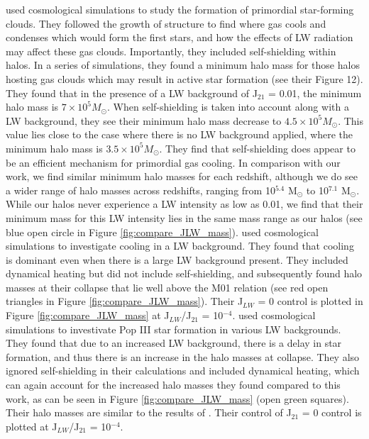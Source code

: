 \documentclass[a4paper,fleqn,usenatbib]{mnras}
\begin{document}
\citet{Yoshida03} used cosmological simulations to study the formation of primordial star-forming clouds. They followed the growth of structure to find where gas cools and condenses which would form the first stars, and how the effects of LW radiation may affect these gas clouds. Importantly, they included \hh{} self-shielding within halos. In a series of simulations, they found a minimum halo mass for those halos hosting gas clouds which may result in active star formation (see their Figure 12). They found that in the presence of a LW background of J$_{21}$ = 0.01, the minimum halo mass is $7 \times 10^{5} M_{\odot}$. When \hh{} self-shielding is taken into account along with a LW background, they see their minimum halo mass decrease to $4.5 \times 10^{5} M_{\odot}$. This value lies close to the case where there is no LW background applied, where the minimum halo mass is $3.5 \times 10^{5} M_{\odot}$. They find that \hh{} self-shielding does appear to be an efficient mechanism for primordial gas cooling. In comparison with our work, we find similar minimum halo masses for each redshift, although we do see a wider range of halo masses across redshifts, ranging from 10$^{5.4}$ M$_{\odot}$ to 10$^{7.1}$ M$_{\odot}$. While our halos never experience a LW intensity as low as 0.01, we find that their minimum mass for this LW intensity lies in the same mass range as our halos (see blue open circle in Figure \ref{fig:compare_JLW_mass}). \citet{Wise07_UVB} used cosmological simulations to investigate \hh{} cooling in a LW background. They found that \hh{} cooling is dominant even when there is a large LW background present. They included dynamical heating but did not include self-shielding, and subsequently found halo masses at their collapse that lie well above the M01 relation (see red open triangles in Figure \ref{fig:compare_JLW_mass}). Their J$_{LW}$ = 0 control is plotted in Figure \ref{fig:compare_JLW_mass} at J$_{LW}$/J$_{21}$ = 10$^{-4}$. \citet{OShea08} used cosmological simulations to investivate Pop III star formation in various LW backgrounds. They found that due to an increased LW background, there is a delay in star formation, and thus there is an increase in the halo masses at collapse. They also ignored \hh{} self-shielding in their calculations and included dynamical heating, which can again account for the increased halo masses they found compared to this work, as can be seen in Figure \ref{fig:compare_JLW_mass} (open green squares). Their halo masses are similar to the results of \citet{Wise07_UVB}. Their control of J$_{21}$ = 0 control is plotted at J$_{LW}$/J$_{21}$ = 10$^{-4}$.
\end{document}
